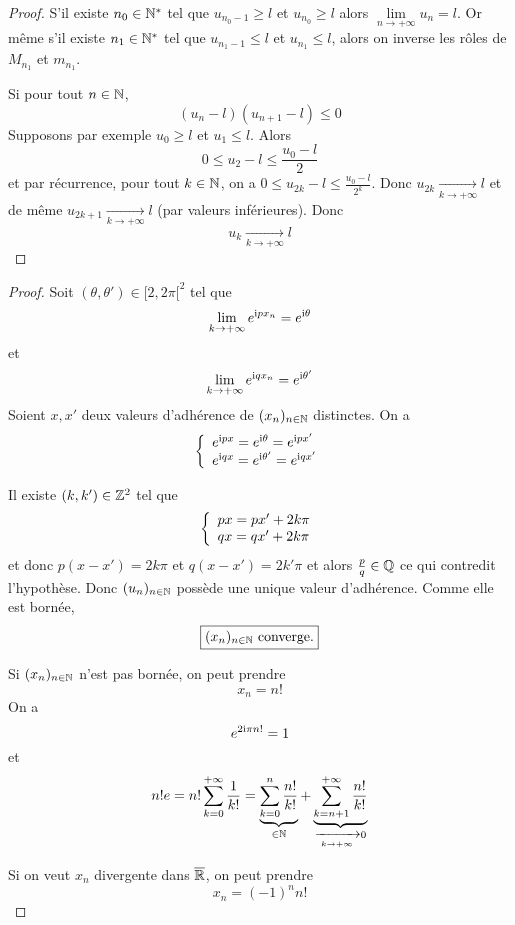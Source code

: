 \begin{proof}
	S'il existe $n_{0}\in\mathbb{N}^{*}$ tel que $u_{n_{0}-1}\geqslant l$ et $u_{n_{0}}\geqslant l$ alors $\lim\limits_{n\to+\infty}u_{n}=l$. Or même s'il existe $n_{1}\in\mathbb{N}^{*}$ tel que $u_{n_{1}-1}\leqslant l$ et $u_{n_{1}}\leqslant l$, alors on inverse les rôles de $M_{n_{1}}$ et $m_{n_{1}}$.

	Si pour tout $n\in\mathbb{N}$,
	$$(u_{n}-l)(u_{n+1}-l)\leqslant 0$$
	Supposons par exemple $u_{0}\geqslant l$ et $u_{1}\leqslant l$. Alors 
	$$0\leqslant u_{2}-l\leqslant\frac{u_{0}-l}{2}$$
	et par récurrence, pour tout $k\in\mathbb{N}$, on a $0\leqslant u_{2k}-l\leqslant\frac{u_{0}-l}{2^{k}}$.
	Donc $u_{2k}\xrightarrow[k\to+\infty]{}l$ et de même $u_{2k+1}\xrightarrow[k\to+\infty]{}l$ (par valeurs inférieures). Donc 
	$$\boxed{u_{k}\xrightarrow[k\to+\infty]{}l}$$
\end{proof}

\begin{proof}
	Soit $(\theta,\theta')\in[2,2\pi[^{2}$ tel que 
	$$\lim\limits_{k\to+\infty}e^{\mathrm{i} px_{n}}=e^{\mathrm{i} \theta}$$ et 
	$$\lim\limits_{k\to+\infty}e^{\mathrm{i} qx_{n}}=e^{\mathrm{i} \theta'}$$
	Soient $x,x'$ deux valeurs d'adhérence de $(x_{n})_{n\in\mathbb{N}}$ distinctes. On a 
	$$
	\left\{
		\begin{array}[]{l}
			e^{\i px}=e^{\i \theta}=e^{\i px'}\\
			e^{\i qx}=e^{\i \theta'}=e^{\i qx'}
		\end{array}
	\right.
	$$

	Il existe $(k,k')\in\mathbb{Z}^{2}$ tel que 
	$$
	\left\{
		\begin{array}[]{l}
			px=px'+2k\pi\\
			qx=qx'+2k\pi
		\end{array}
	\right.
	$$
	et donc $p(x-x')=2k\pi$ et $q(x-x')=2k'\pi$ et alors $\frac{p}{q}\in\mathbb{Q}$ ce qui contredit l'hypothèse. Donc $(u_{n})_{n\in\mathbb{N}}$ possède une unique valeur d'adhérence. Comme elle est bornée,
	$$\boxed{(x_{n})_{n\in\mathbb{N}}\text{ converge.}}$$

	Si $(x_{n})_{n\in\mathbb{N}}$ n'est pas bornée, on peut prendre 
	$$\boxed{x_{n}=n!}$$
	On a 
	$$e^{2\mathrm{i} \pi n!}=1$$
	et 
	$$n!e=n!\sum_{k=0}^{+\infty}\frac{1}{k!}=\underbrace{\sum_{k=0}^{n}\frac{n!}{k!}}_{\in\mathbb{N}}+\underbrace{\sum_{k=n+1}^{+\infty}\frac{n!}{k!}}_{\xrightarrow[k\to+\infty]{}0}$$
	
	Si on veut $x_{n}$ divergente dans $\overline{\mathbb{R}}$, on peut prendre 
	$$\boxed{x_{n}=(-1)^{n}n!}$$
\end{proof}

